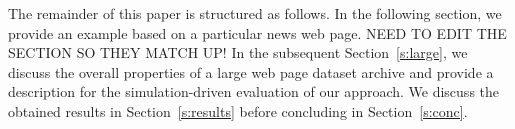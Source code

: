 \documentclass[letterpaper,conference]{IEEEtran}
\begin{document}
The remainder of this paper is structured as follows.
In the following section, %
we provide an example based on a particular news web page.
\newline
NEED TO EDIT THE SECTION SO THEY MATCH UP!
In the subsequent Section~\ref{s:large}, we discuss the overall properties of a large web page dataset archive and provide a description for the simulation-driven evaluation of our approach. 
We discuss the obtained results in Section~\ref{s:results} before concluding in Section~\ref{s:conc}.


\end{document}
